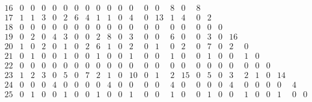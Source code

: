 \begin{landscape}
\[\begin{array}{c|ccccccccccccccccccccccccc}
16&  0&  0&  0&  0&  0&  0&  0&  0&  0&  0&  0&  0&  0&  8&  0&  8&   &   &   &   &   &   &   &   &   \\
17&  1&  1&  3&  0&  2&  6&  4&  1&  1&  0&  4&  0& 13&  1&  4&  0&  2&   &   &   &   &   &   &   &   \\
18&  0&  0&  0&  0&  0&  0&  0&  0&  0&  0&  0&  0&  0&  0&  0&  0&  0&  0&   &   &   &   &   &   &   \\
19&  0&  2&  0&  4&  3&  0&  0&  2&  8&  0&  3&  0&  0&  6&  0&  0&  3&  0& 16&   &   &   &   &   &   \\
20&  1&  0&  2&  0&  1&  0&  2&  6&  1&  0&  2&  0&  1&  0&  2&  0&  7&  0&  2&  0&   &   &   &   &   \\
21&  0&  1&  0&  0&  1&  0&  0&  1&  0&  0&  1&  0&  0&  1&  0&  0&  1&  0&  0&  1&  0&   &   &   &   \\
22&  0&  0&  0&  0&  0&  0&  0&  0&  0&  0&  0&  0&  0&  0&  0&  0&  0&  0&  0&  0&  0&  0&   &   &   \\
23&  1&  2&  3&  0&  5&  0&  7&  2&  1&  0& 10&  0&  1&  2& 15&  0&  5&  0&  3&  2&  1&  0& 14&   &   \\
24&  0&  0&  0&  4&  0&  0&  0&  0&  4&  0&  0&  0&  0&  4&  0&  0&  0&  0&  4&  0&  0&  0&  0&  4&   \\
25&  0&  1&  0&  0&  1&  0&  0&  1&  0&  0&  1&  0&  0&  1&  0&  0&  1&  0&  0&  1&  0&  0&  1&  0&  0\\
\end{array}
\]


\end{landscape}
